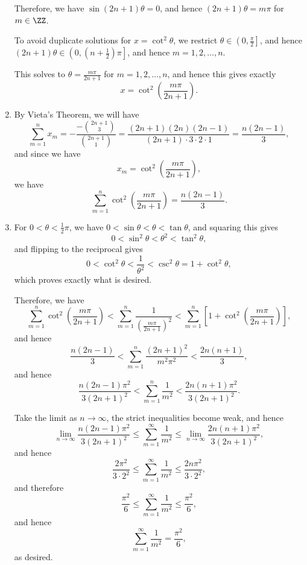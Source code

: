 \begin{enumerate}
          Therefore, we have \(\sin (2n + 1) \theta = 0\), and hence \((2n + 1) \theta = m \pi\) for \(m \in \ZZ\).

          To avoid duplicate solutions for \(x = \cot^2 \theta\), we restrict \(\theta \in \left(0, \frac{\pi}{2}\right]\), and hence \((2n + 1) \theta \in \left(0, \left(n + \frac{1}{2} \right)\pi\right]\), and hence \(m = 1, 2, \ldots, n\).

          This solves to \(\theta = \frac{m\pi}{2n + 1}\) for \(m = 1, 2, \ldots, n\), and hence this gives exactly
          \[
              x = \cot^2 \left(\frac{m \pi}{2n + 1}\right).
          \]

    \item By Vieta's Theorem, we will have
          \[
              \sum_{m = 1}^{n} x_m = -\frac{-\binom{2n + 1}{3}}{\binom{2n + 1}{1}} = \frac{(2n + 1)(2n)(2n - 1)}{(2n + 1) \cdot 3 \cdot 2 \cdot 1} = \frac{n(2n - 1)}{3},
          \]
          and since we have
          \[
              x_m = \cot^2 \left(\frac{m \pi}{2n + 1}\right),
          \]
          we have
          \[
              \sum_{m = 1}^{n} \cot^2 \left(\frac{m \pi}{2n + 1}\right) = \frac{n (2n - 1)}{3}.
          \]

    \item For \(0 < \theta < \frac{1}{2}\pi\), we have \(0 < \sin \theta < \theta < \tan \theta\), and squaring this gives
          \[
              0 < \sin^2 \theta < \theta^2 < \tan^2 \theta,
          \]
          and flipping to the reciprocal gives
          \[
              0 < \cot^2 \theta < \frac{1}{\theta^2} < \csc^2 \theta = 1 + \cot^2 \theta,
          \]
          which proves exactly what is desired.

          Therefore, we have
          \[
              \sum_{m = 1}^{n} \cot^2 \left(\frac{m\pi}{2n + 1}\right) < \sum_{m = 1}^{n} \frac{1}{\left(\frac{m\pi}{2n + 1}\right)^2} < \sum_{m = 1}^{n} \left[1 + \cot^2 \left(\frac{m\pi}{2n + 1}\right)\right],
          \]
          and hence
          \[
              \frac{n(2n - 1)}{3} < \sum_{m = 1}^{n} \frac{(2n + 1)^2}{m^2 \pi^2} < \frac{2n(n + 1)}{3},
          \]
          and hence
          \[
              \frac{n(2n - 1) \pi^2}{3 (2n + 1)^2} < \sum_{m = 1}^{n} \frac{1}{m^2} < \frac{2n(n + 1) \pi^2}{3 (2n + 1)^2}.
          \]

          Take the limit as \(n \to \infty\), the strict inequalities become weak, and hence
          \[
              \lim_{n \to \infty} \frac{n(2n - 1) \pi^2}{3 (2n + 1)^2} \leq \sum_{m = 1}^{\infty} \frac{1}{m^2} \leq \lim_{n \to \infty} \frac{2n(n + 1) \pi^2}{3 (2n + 1)^2},
          \]
          and hence
          \[
              \frac{2 \pi^2}{3 \cdot 2^2} \leq \sum_{m = 1}^{\infty} \frac{1}{m^2} \leq \frac{2n \pi^2}{3 \cdot 2^2},
          \]
          and therefore
          \[
              \frac{\pi^2}{6} \leq \sum_{m = 1}^{\infty} \frac{1}{m^2} \leq \frac{\pi^2}{6},
          \]
          and hence
          \[
              \sum_{m = 1}^{\infty} \frac{1}{m^2} = \frac{\pi^2}{6},
          \]
          as desired.
\end{enumerate}
